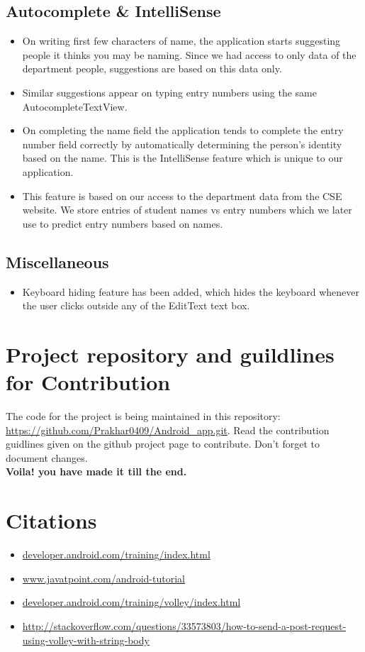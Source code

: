 \documentclass[12pt]{article}
\begin{document}
    
   
    
\subsection{Autocomplete \& IntelliSense}
\begin{itemize}
\item On writing first few characters of name, the application starts suggesting people it thinks you may be naming. Since we had access to only data of the department people, suggestions are based on this data only.
\item Similar suggestions appear on typing entry numbers using the same AutocompleteTextView.
\item On completing the name field the application tends to complete the entry number field correctly by automatically determining the person's identity based on the name. This is the IntelliSense feature which is unique to our application.
\item This feature is based on our access to the department data from the CSE website. We store entries of student names vs entry numbers which we later use to predict entry numbers based on names.
\end{itemize}

\subsection{Miscellaneous}
\begin{itemize}
\item Keyboard hiding feature has been added, which hides the keyboard whenever the user clicks outside any of the EditText text box.
\end{itemize}

\section{Project repository and guildlines for Contribution}
\par The code for the project is being maintained in this repository: \url{ https://github.com/Prakhar0409/Android\_app.git}.
Read the contribution guidlines given on the github project page to contribute. Don't forget to document changes. 
\\
\textbf{Voila! you have made it till the end.}

\section{Citations}
\begin{itemize}
\item \url{ developer.android.com/training/index.html}
\item \url{www.javatpoint.com/android-tutorial}
\item \url{developer.android.com/training/volley/index.html}
\sloppy
\item \url{http://stackoverflow.com/questions/33573803/how-to-send-a-post-request-using-volley-with-string-body}
\end{itemize}





\end{document}
